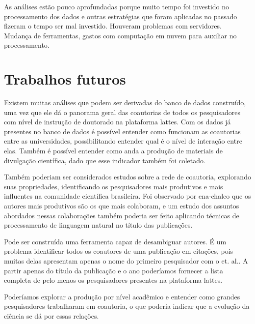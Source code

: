 As análises estão pouco aprofundadas porque muito tempo foi investido no processamento dos dados e outras estratégias que foram aplicadas no passado fizeram o tempo ser mal investido. Houveram problemas com servidores. Mudança de ferramentas, gastos com computação em nuvem para auxiliar no processamento.

\section{Trabalhos futuros}

Existem muitas análises que podem ser derivadas do banco de dados construído, uma vez que ele dá o panorama geral das coautorias de todos os pesquisadores com nível de instrução de doutorado na plataforma lattes. Com os dados já presentes no banco de dados é possível entender como funcionam as coautorias entre as universidades, possibilitando entender qual é o nível de interação entre elas. Também é possível entender como anda a produção de materiais de divulgação científica, dado que esse indicador também foi coletado.

Também poderiam ser considerados estudos sobre a rede de coautoria, explorando suas propriedades, identificando os pesquisadores mais produtivos e mais influentes na comunidade científica brasileira. Foi observado por ena-chalco que os autores mais produtivos são os que mais colaboram, e um estudo dos assuntos abordados nessas colaborações também poderia ser feito aplicando técnicas de processamento de linguagem natural no título das publicações.

Pode ser construída uma ferramenta capaz de desambiguar autores. É um problema identificar todos os coautores de uma publicação em citações, pois muitas delas apresentam apenas o nome do primeiro pesquisador com o et. al.. A partir apenas do título da publicação e o ano poderíamos fornecer a lista completa de pelo menos os pesquisadores presentes na plataforma lattes.

Poderíamos explorar a produção por nível acadêmico e entender como grandes pesquisadores trabalharam em coautoria, o que poderia indicar que a evolução da ciência se dá por essas relações.